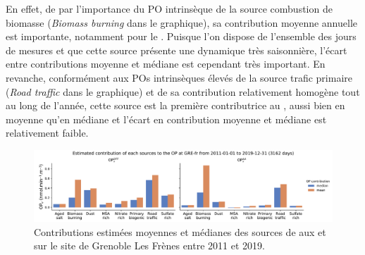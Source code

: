 En effet, de par l'importance du PO intrinsèque de la source combustion de biomasse
(\textit{Biomass burning} dans le graphique), sa contribution moyenne annuelle est
importante, notamment pour le \POAAv.  Puisque l'on dispose de
l'ensemble des jours de mesures et que cette source présente une dynamique très
saisonnière, l'écart entre contributions moyenne et médiane est cependant très important.
En revanche, conformément aux POs intrinsèques élevés de la source trafic primaire
(\textit{Road traffic} dans le graphique) et de sa contribution relativement homogène tout au
long de l'année, cette source est la première contributrice au \PODTTv, aussi bien en
moyenne qu'en médiane et l'écart en contribution moyenne et médiane est relativement
faible.

\begin{figure}[ht]
    \centering
    \includegraphics[width=1.0\linewidth]{figures/chapter05/OPGRE-fr_source_estimated.pdf}
    \caption{Contributions estimées moyennes et médianes des sources de \PMdix{} aux
        \PODTTv{} et \POAAv{} sur le site de Grenoble Les Frènes entre 2011 et 2019.}%
    \label{fig:OPGRE-fr_source_estimated}
\end{figure}


